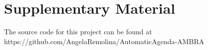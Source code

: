 \documentclass[10pt,twocolumn,letterpaper]{article}
\begin{document}
\appendix

\section{Supplementary Material} 
The source code for this project can be found at https://github.com/AngelaRemolina/AutomaticAgenda-AMBRA




{


}
\end{document}
